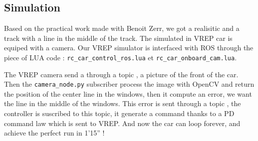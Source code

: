 \subsection{Simulation}

Based on the practical work made with Benoit Zerr, we got a realisitic and a track with a line in the middle of the track.
The simulated in VREP car is equiped with a camera. Our VREP simulator is interfaced with ROS through the piece of LUA code :
\texttt{rc_car_control_ros.lua} et \texttt{rc_car_onboard_cam.lua}.

The VREP camera send a through a topic \texttt{\image}, a picture of the front of the car. 
Then the \texttt{camera_node.py} subscriber process the image with OpenCV and return the position
of the center line in the windows, then it compute an error, we want the line in the middle of the windows. 
This error is sent through a topic \texttt{\error}, the controller is suscribed to this topic,
it generate a command thanks to a PD command law which is sent to VREP. And now the car can loop forever, and achieve 
the perfect run in 1'15'' !
